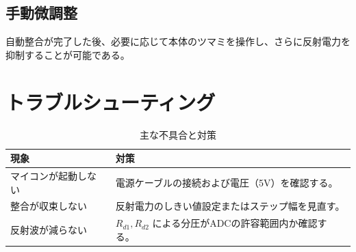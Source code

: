 \documentclass[uplatex, 12pt]{ujbook}
\begin{document}
\subsection{手動微調整}
自動整合が完了した後、必要に応じて本体のツマミを操作し、さらに反射電力を抑制することが可能である。

\section{トラブルシューティング}
\begin{table}[htbp]
    \centering
    \caption{主な不具合と対策}
    \begin{tabular}{|l|l|}
        \hline
        現象 & 対策 \\ \hline
        マイコンが起動しない & 電源ケーブルの接続および電圧（5V）を確認する。 \\ \hline
        整合が収束しない & 反射電力のしきい値設定またはステップ幅を見直す。 \\ \hline
        反射波が減らない & $R_{d1}, R_{d2}$ による分圧がADCの許容範囲内か確認する。 \\ \hline
    \end{tabular}
\end{table}
\end{document}
